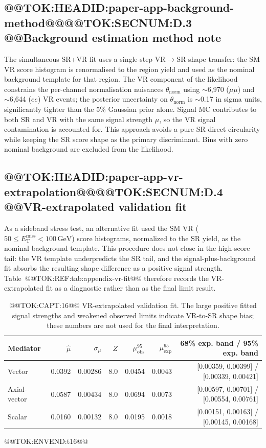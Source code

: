 \documentclass[11pt]{article}
\newcommand{\GeV}{\text{GeV}}
\newcommand{\MET}{\ensuremath{E_{\mathrm{T}}^{\mathrm{miss}}}}
\begin{document}
\subsection{@@TOK:HEADID:paper-app-background-method@@@@TOK:SECNUM:D.3 @@Background estimation method note}

The simultaneous SR+VR fit uses a single-step VR$\to$SR shape transfer:
the SM VR score histogram is renormalised to the region yield and used
as the nominal background template for that region. The VR component of
the likelihood constrains the per-channel normalisation nuisances
$\theta_{\mathrm{norm}}$ using $\sim$6,970 ($\mu\mu$) and $\sim$6,644 ($ee$)
VR events; the posterior uncertainty on $\theta_{\mathrm{norm}}$ is
$\sim$0.17 in sigma units, significantly tighter than the 5\% Gaussian
prior alone. Signal MC contributes to both SR and VR with the same
signal strength $\mu$, so the VR signal contamination is accounted for.
This approach avoids a pure SR-direct circularity while keeping the SR
score shape as the primary discriminant.
Bins with zero nominal background are excluded from the likelihood.

\subsection{@@TOK:HEADID:paper-app-vr-extrapolation@@@@TOK:SECNUM:D.4 @@VR-extrapolated validation fit}

As a sideband stress test, an alternative fit used the SM VR
(\(50\le\MET<100\,\GeV\)) score histograms, normalized to the SR yield, as the
nominal background template. This procedure does not close in the high-score tail:
the VR template underpredicts the SR tail, and the signal-plus-background fit absorbs
the resulting shape difference as a positive signal strength. Table~@@TOK:REF:tab:appendix-vr-fit@@
therefore records the VR-extrapolated fit as a diagnostic rather than as the final
limit result.

\begin{table}[t]
\centering
\caption{@@TOK:CAPT:16@@ VR-extrapolated validation fit. The large positive fitted signal
strengths and weakened observed limits indicate VR-to-SR shape bias; these
numbers are not used for the final interpretation.}
\label{tab:appendix-vr-fit}
%
\begin{tabular}{lrrrrrr}
\toprule
Mediator & \(\hat{\mu}\) & \(\sigma_{\mu}\) & \(Z\) &
\(\mu^{95}_{\mathrm{obs}}\) & \(\mu^{95}_{\mathrm{exp}}\) & 68\% exp. band / 95\% exp. band \\
\midrule
Vector & 0.0392 & 0.00286 & 8.0 & 0.0454 & 0.0043 &
[0.00359, 0.00399] / [0.00339, 0.00421] \\
Axial-vector & 0.0587 & 0.00434 & 8.0 & 0.0694 & 0.0073 &
[0.00597, 0.00701] / [0.00554, 0.00761] \\
Scalar & 0.0160 & 0.00132 & 8.0 & 0.0195 & 0.0018 &
[0.00151, 0.00163] / [0.00145, 0.00168] \\
\bottomrule
\end{tabular}

@@TOK:ENVEND:t16@@\end{table}
\end{document}
